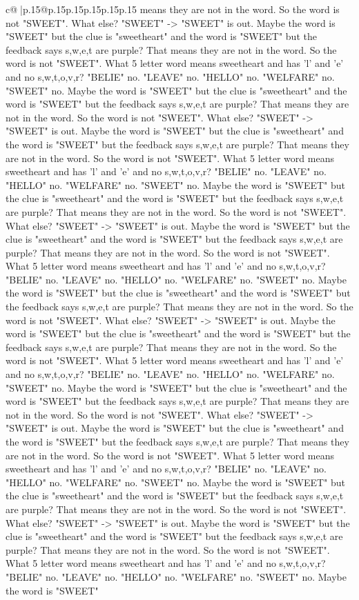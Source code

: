 \documentclass{article}
\begin{document}
{\begin{supertabular}{c@{$\;$}|p{.15\linewidth}@{}p{.15\linewidth}p{.15\linewidth}p{.15\linewidth}p{.15\linewidth}p{.15\linewidth}}
{{{means they are not in the word. So the word is not "SWEET". What else? "SWEET" {-}> "SWEET" is out. Maybe the word is "SWEET" but the clue is "sweetheart" and the word is "SWEET" but the feedback says s,w,e,t are purple? That means they are not in the word. So the word is not "SWEET". What 5 letter word means sweetheart and has 'l' and 'e' and no s,w,t,o,v,r? "BELIE" no. "LEAVE" no. "HELLO" no. "WELFARE" no. "SWEET" no. Maybe the word is "SWEET" but the clue is "sweetheart" and the word is "SWEET" but the feedback says s,w,e,t are purple? That means they are not in the word. So the word is not "SWEET". What else? "SWEET" {-}> "SWEET" is out. Maybe the word is "SWEET" but the clue is "sweetheart" and the word is "SWEET" but the feedback says s,w,e,t are purple? That means they are not in the word. So the word is not "SWEET". What 5 letter word means sweetheart and has 'l' and 'e' and no s,w,t,o,v,r? "BELIE" no. "LEAVE" no. "HELLO" no. "WELFARE" no. "SWEET" no. Maybe the word is "SWEET" but the clue is "sweetheart" and the word is "SWEET" but the feedback says s,w,e,t are purple? That means they are not in the word. So the word is not "SWEET". What else? "SWEET" {-}> "SWEET" is out. Maybe the word is "SWEET" but the clue is "sweetheart" and the word is "SWEET" but the feedback says s,w,e,t are purple? That means they are not in the word. So the word is not "SWEET". What 5 letter word means sweetheart and has 'l' and 'e' and no s,w,t,o,v,r? "BELIE" no. "LEAVE" no. "HELLO" no. "WELFARE" no. "SWEET" no. Maybe the word is "SWEET" but the clue is "sweetheart" and the word is "SWEET" but the feedback says s,w,e,t are purple? That means they are not in the word. So the word is not "SWEET". What else? "SWEET" {-}> "SWEET" is out. Maybe the word is "SWEET" but the clue is "sweetheart" and the word is "SWEET" but the feedback says s,w,e,t are purple? That means they are not in the word. So the word is not "SWEET". What 5 letter word means sweetheart and has 'l' and 'e' and no s,w,t,o,v,r? "BELIE" no. "LEAVE" no. "HELLO" no. "WELFARE" no. "SWEET" no. Maybe the word is "SWEET" but the clue is "sweetheart" and the word is "SWEET" but the feedback says s,w,e,t are purple? That means they are not in the word. So the word is not "SWEET". What else? "SWEET" {-}> "SWEET" is out. Maybe the word is "SWEET" but the clue is "sweetheart" and the word is "SWEET" but the feedback says s,w,e,t are purple? That means they are not in the word. So the word is not "SWEET". What 5 letter word means sweetheart and has 'l' and 'e' and no s,w,t,o,v,r? "BELIE" no. "LEAVE" no. "HELLO" no. "WELFARE" no. "SWEET" no. Maybe the word is "SWEET" but the clue is "sweetheart" and the word is "SWEET" but the feedback says s,w,e,t are purple? That means they are not in the word. So the word is not "SWEET". What else? "SWEET" {-}> "SWEET" is out. Maybe the word is "SWEET" but the clue is "sweetheart" and the word is "SWEET" but the feedback says s,w,e,t are purple? That means they are not in the word. So the word is not "SWEET". What 5 letter word means sweetheart and has 'l' and 'e' and no s,w,t,o,v,r? "BELIE" no. "LEAVE" no. "HELLO" no. "WELFARE" no. "SWEET" no. Maybe the word is "SWEET" }}}
\end{supertabular}}
\end{document}
